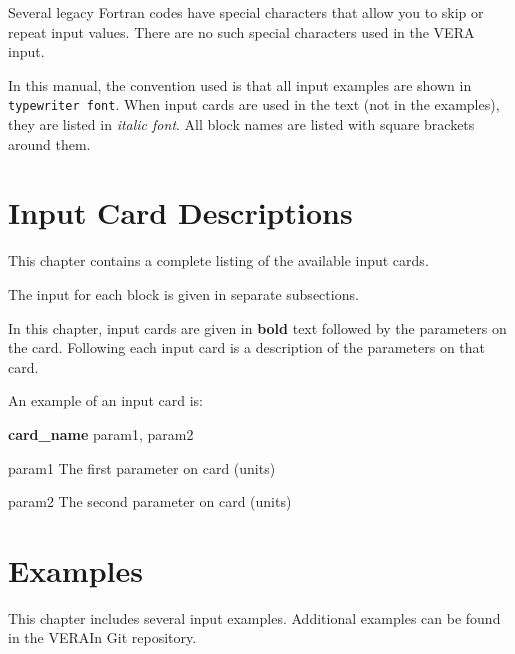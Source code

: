 \documentclass{report}
\numberwithin{equation}{section}
\newenvironment{cardlist}
 {\begin{list}{}
  {\setlength{\labelwidth}{2.0cm}
   \setlength{\leftmargin}{2.5cm}   %
   \setlength{\labelsep}{0.25cm}    %
   \setlength{\rightmargin}{2.0cm}
   \setlength{\topsep}{-0.2cm}
   \setlength{\itemsep}{0ex plus0.2ex} }}
{\end{list}}
\begin{document}
Several legacy Fortran codes have special characters that allow you to skip
or repeat input values.   There are no such special characters used in the VERA input.

In this manual, the convention used is that all input examples are shown in {\tt typewriter font}.
When input cards are used in the text (not in the examples), they are listed in {\it italic font}.   
All block names are listed with square brackets around them.












\chapter{Input Card Descriptions} \label{chap:cards}
This chapter contains a complete listing of the available input cards.

The input for each block is given in separate subsections.

In this chapter, input cards are given in {\bf bold} text followed by the parameters on the card.
Following each input card is a description of the parameters on that card.

An example of an input card is:

{\bf card\_name} param1, param2
\begin{cardlist}
  \item[param1]  The first parameter on card (units)
  \item[param2]  The second parameter on card (units)
\end{cardlist}



%

\chapter{Examples}
\label{chap:example}

This chapter includes several input examples.  Additional examples can be found in the VERAIn Git repository.
\end{document}
